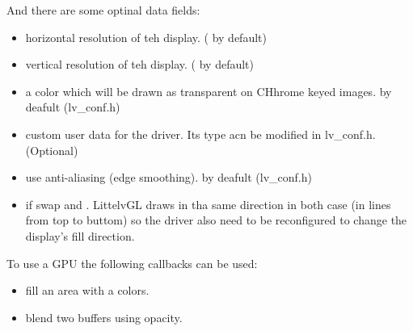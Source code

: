 \documentclass[letterpaper,10pt,english]{sphinxmanual}
\begin{document}
And there are some optinal data fields:
\begin{itemize}
\item {} 
 horizontal resolution of teh display. ( by default)

\item {} 
 vertical resolution of teh display. ( by default)

\item {} 
 a color which will be drawn as transparent on CHhrome keyed images.  by deafult (lv\_conf.h)

\item {} 
 custom user data for the driver. Its type acn be modified in lv\_conf.h. (Optional)

\item {} 
 use anti-aliasing (edge smoothing).  by deafult (lv\_conf.h)

\item {} 
 if  swap  and . LittelvGL draws in tha same direction in both case (in lines from top to buttom) so the driver also need to be reconfigured to change the display’s fill direction.

\end{itemize}

To use a GPU the following callbacks can be used:
\begin{itemize}
\item {} 
 fill an area with a colors.

\item {} 
 blend two buffers using opacity.

\end{itemize}
\end{document}
